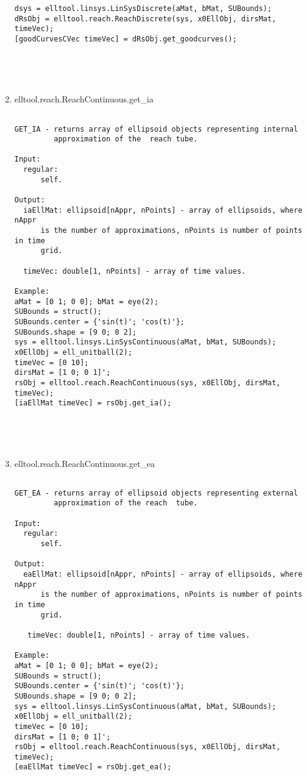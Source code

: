 \begin{enumerate}
\begin{lstlisting}
dsys = elltool.linsys.LinSysDiscrete(aMat, bMat, SUBounds);
dRsObj = elltool.reach.ReachDiscrete(sys, x0EllObj, dirsMat, timeVec);
[goodCurvesCVec timeVec] = dRsObj.get_goodcurves();





\end{lstlisting}
\fontfamily{\familydefault}
\selectfont
\item {elltool.reach.ReachContinuous.get\_ia}
\selectfont
\begin{lstlisting}

GET_IA - returns array of ellipsoid objects representing internal
         approximation of the  reach tube.

Input:
  regular:
      self.

Output:
  iaEllMat: ellipsoid[nAppr, nPoints] - array of ellipsoids, where nAppr
      is the number of approximations, nPoints is number of points in time
      grid.

  timeVec: double[1, nPoints] - array of time values.

Example:
aMat = [0 1; 0 0]; bMat = eye(2);
SUBounds = struct();
SUBounds.center = {'sin(t)'; 'cos(t)'};
SUBounds.shape = [9 0; 0 2];
sys = elltool.linsys.LinSysContinuous(aMat, bMat, SUBounds);
x0EllObj = ell_unitball(2);
timeVec = [0 10];
dirsMat = [1 0; 0 1]';
rsObj = elltool.reach.ReachContinuous(sys, x0EllObj, dirsMat, timeVec);
[iaEllMat timeVec] = rsObj.get_ia();





\end{lstlisting}
\fontfamily{\familydefault}
\selectfont
\item {elltool.reach.ReachContinuous.get\_ea}
\selectfont
\begin{lstlisting}

GET_EA - returns array of ellipsoid objects representing external
         approximation of the reach  tube.

Input:
  regular:
      self.

Output:
  eaEllMat: ellipsoid[nAppr, nPoints] - array of ellipsoids, where nAppr
      is the number of approximations, nPoints is number of points in time
      grid.

   timeVec: double[1, nPoints] - array of time values.

Example:
aMat = [0 1; 0 0]; bMat = eye(2);
SUBounds = struct();
SUBounds.center = {'sin(t)'; 'cos(t)'};
SUBounds.shape = [9 0; 0 2];
sys = elltool.linsys.LinSysContinuous(aMat, bMat, SUBounds);
x0EllObj = ell_unitball(2);
timeVec = [0 10];
dirsMat = [1 0; 0 1]';
rsObj = elltool.reach.ReachContinuous(sys, x0EllObj, dirsMat, timeVec);
[eaEllMat timeVec] = rsObj.get_ea();


\end{lstlisting}
\end{enumerate}
